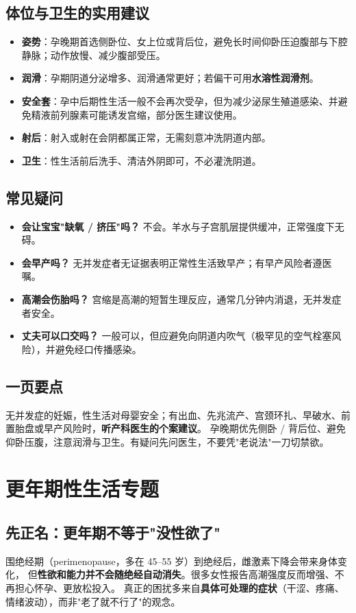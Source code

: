 \section{体位与卫生的实用建议}
\begin{itemize}
  \item \textbf{姿势}：孕晚期首选侧卧位、女上位或背后位，避免长时间仰卧压迫腹部与下腔静脉；动作放慢、减少腹部受压。
  \item \textbf{润滑}：孕期阴道分泌增多、润滑通常更好；若偏干可用\textbf{水溶性润滑剂}。
  \item \textbf{安全套}：孕中后期性生活一般不会再次受孕，但为减少泌尿生殖道感染、并避免精液前列腺素可能诱发宫缩，部分医生建议使用。
  \item \textbf{射后}：射入或射在会阴都属正常，无需刻意冲洗阴道内部。
  \item \textbf{卫生}：性生活前后洗手、清洁外阴即可，不必灌洗阴道。
\end{itemize}

\section{常见疑问}
\begin{itemize}
  \item \textbf{会让宝宝"缺氧 / 挤压"吗？} 不会。羊水与子宫肌层提供缓冲，正常强度下无碍。
  \item \textbf{会早产吗？} 无并发症者无证据表明正常性生活致早产；有早产风险者遵医嘱。
  \item \textbf{高潮会伤胎吗？} 宫缩是高潮的短暂生理反应，通常几分钟内消退，无并发症者安全。
  \item \textbf{丈夫可以口交吗？} 一般可以，但应避免向阴道内吹气（极罕见的空气栓塞风险），并避免经口传播感染。
\end{itemize}

\section{一页要点}
无并发症的妊娠，性生活对母婴安全；有出血、先兆流产、宫颈环扎、早破水、前置胎盘或早产风险时，\textbf{听产科医生的个案建议}。
孕晚期优先侧卧 / 背后位、避免仰卧压腹，注意润滑与卫生。有疑问先问医生，不要凭"老说法"一刀切禁欲。


\chapter{更年期性生活专题}

\section{先正名：更年期不等于"没性欲了"}
围绝经期（perimenopause，多在 45--55 岁）到绝经后，雌激素下降会带来身体变化，
但\textbf{性欲和能力并不会随绝经自动消失}。很多女性报告高潮强度反而增强、不再担心怀孕、更放松投入。
真正的困扰多来自\textbf{具体可处理的症状}（干涩、疼痛、情绪波动），而非"老了就不行了"的观念。

